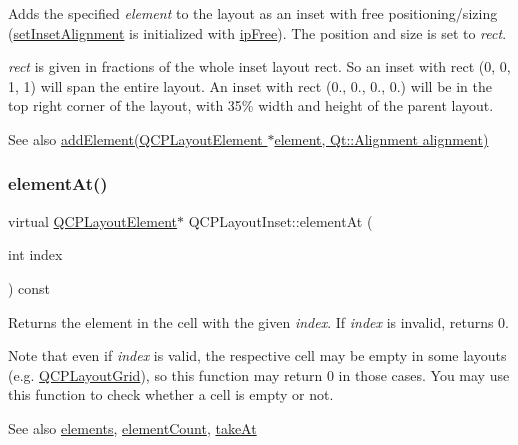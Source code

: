 Adds the specified {\itshape element} to the layout as an inset with free positioning/sizing (\hyperlink{class_q_c_p_layout_inset_a62882a4f9ad58bb0f53da12fde022abe}{set\+Inset\+Alignment} is initialized with \hyperlink{class_q_c_p_layout_inset_a8b9e17d9a2768293d2a7d72f5e298192a06556307ae5b8255297984219da4e8f4}{ip\+Free}). The position and size is set to {\itshape rect}.

{\itshape rect} is given in fractions of the whole inset layout rect. So an inset with rect (0, 0, 1, 1) will span the entire layout. An inset with rect (0., 0., 0., 0.) will be in the top right corner of the layout, with 35\% width and height of the parent layout.

\begin{DoxySeeAlso}{See also}
\hyperlink{class_q_c_p_layout_inset_ad61529eb576af7f04dff94abb10c745a}{add\+Element(\+Q\+C\+P\+Layout\+Element $\ast$element, Qt\+::\+Alignment alignment)} 
\end{DoxySeeAlso}
\mbox{\label{class_q_c_p_layout_inset_a747a1c6f09d24e34b9179ecad2658066}} 
\subsubsection{\texorpdfstring{element\+At()}{elementAt()}\hspace{0.1cm}{\footnotesize\ttfamily [1/2]}}
{\footnotesize\ttfamily virtual \hyperlink{class_q_c_p_layout_element}{Q\+C\+P\+Layout\+Element}$\ast$ Q\+C\+P\+Layout\+Inset\+::element\+At (\begin{DoxyParamCaption}\item[{int}]{index }\end{DoxyParamCaption}) const\hspace{0.3cm}{\ttfamily [virtual]}}

Returns the element in the cell with the given {\itshape index}. If {\itshape index} is invalid, returns 0.

Note that even if {\itshape index} is valid, the respective cell may be empty in some layouts (e.\+g. \hyperlink{class_q_c_p_layout_grid}{Q\+C\+P\+Layout\+Grid}), so this function may return 0 in those cases. You may use this function to check whether a cell is empty or not.

\begin{DoxySeeAlso}{See also}
\hyperlink{class_q_c_p_layout_aca129722c019f91d3367046f80abfa77}{elements}, \hyperlink{class_q_c_p_layout_inset_a7f5aa4d48a2e844cfe6dd7ed8f0861df}{element\+Count}, \hyperlink{class_q_c_p_layout_inset_abf2e8233f5b7051220907e62ded490a2}{take\+At} 
\end{DoxySeeAlso}



